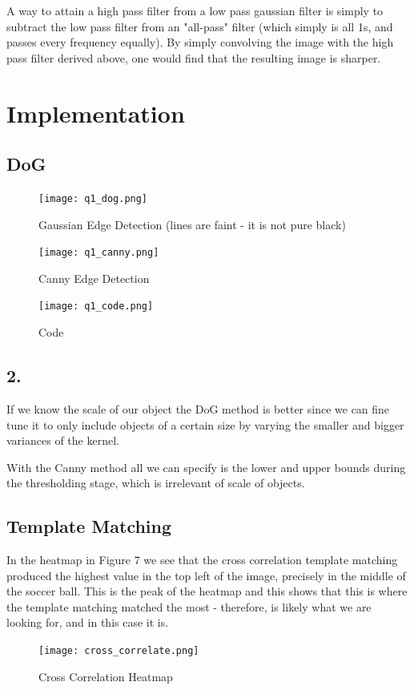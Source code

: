 \documentclass[12pt, letterpaper]{article}
\begin{document}
A way to attain a high pass filter from a low pass gaussian filter is simply to subtract the low pass filter from an "all-pass" filter (which simply is all 1s, and passes every frequency equally). By simply convolving the image with the high pass filter derived above, one would find that the resulting image is sharper.

\section{Implementation}
\subsection{DoG}

\begin{figure}[H]
    \centering
    \texttt{[image: q1\_dog.png]}
    \caption{Gaussian Edge Detection (lines are faint - it is not pure black)}
\end{figure}

\begin{figure}[H]
    \centering
    \texttt{[image: q1\_canny.png]}
    \caption{Canny Edge Detection}
\end{figure}

\begin{figure}[H]
    \centering
    \texttt{[image: q1\_code.png]}
    \caption{Code}
\end{figure}

\subsection{2.}

If we know the scale of our object the DoG method is better since we can fine tune it to only include objects of a certain size by varying the smaller and bigger variances of the kernel.

With the Canny method all we can specify is the lower and upper bounds during the thresholding stage, which is irrelevant of scale of objects.

\subsection{Template Matching}

In the heatmap in Figure 7 we see that the cross correlation template matching produced the highest value in the top left of the image, precisely in the middle of the soccer ball. This is the peak of the heatmap and this shows that this is where the template matching matched the most - therefore, is likely what we are looking for, and in this case it is.
\begin{figure}[H]
    \centering
    \texttt{[image: cross\_correlate.png]}
    \caption{Cross Correlation Heatmap}
\end{figure}
\end{document}
